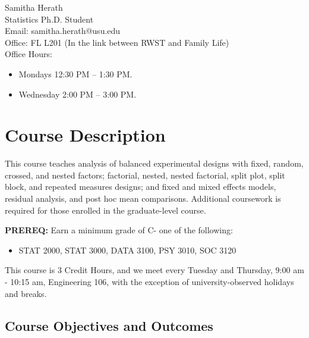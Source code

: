 \documentclass[11pt]{article}\usepackage[]{graphicx}\usepackage[]{xcolor}
\begin{document}
Samitha Herath \\
Statistics Ph.D. Student \\
Email: samitha.herath@usu.edu\\
Office: FL L201 (In the link between RWST and Family Life)\\
Office Hours:

\begin{itemize}
  \item Mondays 12:30 PM -- 1:30 PM.
  \item Wednesday 2:00 PM -- 3:00 PM.
\end{itemize}

\pagebreak

\section{Course Description}

This course teaches analysis of balanced experimental designs with fixed, random, crossed, and nested factors; factorial, nested, nested factorial, split plot, split block, and repeated measures designs; and fixed and mixed effects models, residual analysis, and post hoc mean comparisons. 
Additional coursework is required for those enrolled in the graduate-level course.

\textbf{PREREQ:} Earn a minimum grade of C- one of the following: 
\begin{itemize}
  \item STAT 2000, STAT 3000, DATA 3100, PSY 3010, SOC 3120
\end{itemize}

This course is 3 Credit Hours, and we meet every Tuesday and Thursday, 9:00 am - 10:15 am, Engineering 106, with the exception of university-observed holidays and breaks.

\subsection{Course Objectives and Outcomes}
\end{document}
